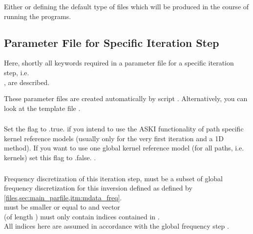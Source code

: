 \subsubsection{} 
Either  or  defining the default type of  files 
which will be produced in the course of running the programs.
%
\subsection{Parameter File for Specific Iteration Step} \label{files,sec:iter_parfile}
%
Here, shortly all keywords required in a parameter file for a specific iteration step, i.e.\ \\
 , are described.

These parameter files are created automatically by script . 
Alternatively, you can look at the template file .
\subsubsection{}
Set the flag to .true. if you intend to use the ASKI functionality of path specific kernel reference models (usually only for the very first iteration and a 1D method). If you want to use one global kernel reference model (for all paths, i.e. kernels) set this flag to .false. .
\subsubsection{} \label{files,sec:iter_parfile,itm:iter_freq}
Frequency discretization of this iteration step, must be a subset of global frequency discretization 
for this inversion defined as defined by \ref{files,sec:main_parfile,itm:mdata_freq}. \\
 must be smaller or equal to  and vector \\
 (of length )
must only contain indices contained in .\\
All indices here are assumed in accordance with the global frequency step .
